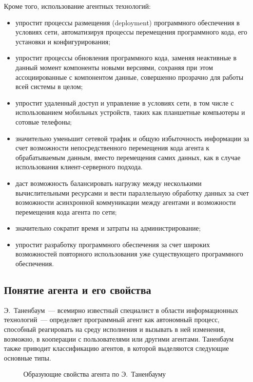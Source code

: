 Кроме того, использование агентных технологий:
\begin{itemize}
\item упростит процессы размещения (deployment) программного обеспечения в условиях сети, автоматизируя процессы перемещения программного кода, его установки и конфигурирования;
\item упростит процессы обновления программного кода, заменяя неактивные в данный момент компоненты новыми версиями, сохраняя при этом ассоциированные с компонентом данные, совершенно прозрачно для работы всей системы в целом;
\item упростит удаленный доступ и управление в условиях сети, в том числе с использованием мобильных устройств, таких как планшетные компьютеры и сотовые телефоны;
\item значительно уменьшит сетевой трафик и общую избыточность информации за счет возможности непосредственного перемещения кода агента к обрабатываемым данным, вместо перемещения самих данных, как в случае использования клиент-серверного подхода.
\item даст возможность балансировать нагрузку между несколькими вычислительными ресурсами и вести параллельную обработку данных за счет возможности асинхронной коммуникации между агентами и возможности перемещения кода агента по сети;
\item значительно сократит время и затраты на администрирование;
\item упростит разработку программного обеспечения за счет широких возможностей повторного использования уже существующего программного обеспечения.
\end{itemize}

\subsection{Понятие агента и его свойства}
Э.~Таненбаум~--- всемирно известный специалист в области информационных технологий~--- определяет программный агент как автономный процесс, способный реагировать на среду исполнения и вызывать в ней изменения, возможно, в кооперации с пользователями или другими агентами. Таненбаум также приводит классификацию агентов, в которой выделяются следующие основные типы.
\begin{figure}[h]
\caption{Образующие свойства агента по Э.~Таненбауму}
\label{1:tanenbaum-agent}
\end{figure}

